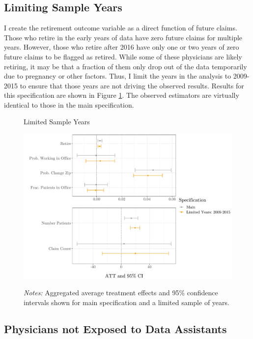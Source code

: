 \documentclass[11pt]{article}
\begin{document}
\subsection{Limiting Sample Years}\label{app:years}

I create the retirement outcome variable as a direct function of future claims. Those who retire in the early years of data have zero future claims for multiple years. However, those who retire after 2016 have only one or two years of zero future claims to be flagged as retired. While some of these physicians are likely retiring, it may be that a fraction of them only drop out of the data temporarily due to pregnancy or other factors. Thus, I limit the years in the analysis to 2009-2015 to ensure that those years are not driving the observed results. Results for this specification are shown in Figure \ref{fig:years}. The observed estimators are virtually identical to those in the main specification. 

\begin{figure}[ht]
    \centering
    \captionsetup{width=.57\linewidth}
    \caption{Limited Sample Years}
    \includegraphics[scale=.57]{Objects/years_graph.pdf}
    \label{fig:years}
    \vspace{2mm}
    \caption*{\footnotesize{\textit{Notes:} Aggregated average treatment effects and 95\% confidence intervals shown for main specification and a limited sample of years.}}
\end{figure}

\subsection{Physicians not Exposed to Data Assistants}\label{app:DA}
\end{document}
